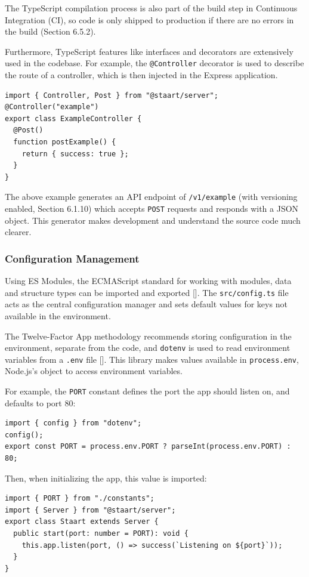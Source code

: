 \documentclass{article}
\begin{document}
The TypeScript compilation process is also part of the build step in Continuous Integration (CI), so code is only shipped to production if there are no errors in the build (Section 6.5.2).

Furthermore, TypeScript features like interfaces and decorators are extensively used in the codebase. For example, the \texttt{@Controller} decorator is used to describe the route of a controller, which is then injected in the Express application.

\begin{verbatim}
import { Controller, Post } from "@staart/server";
@Controller("example")
export class ExampleController {
  @Post()
  function postExample() {
    return { success: true };
  }
}
\end{verbatim}

The above example generates an API endpoint of \texttt{/v1/example} (with versioning enabled, Section 6.1.10) which accepts \texttt{POST} requests and responds with a JSON object. This generator makes development and understand the source code much clearer.

\subsubsection{Configuration Management}

Using ES Modules, the ECMAScript standard for working with modules, data and structure types can be imported and exported []. The \texttt{src/config.ts} file acts as the central configuration manager and sets default values for keys not available in the environment.

The Twelve-Factor App methodology recommends storing configuration in the environment, separate from the code, and \texttt{dotenv} is used to read environment variables from a \texttt{.env} file []. This library makes values available in \texttt{process.env}, Node.js's object to access environment variables.

For example, the \texttt{PORT} constant defines the port the app should listen on, and defaults to port 80:

\begin{verbatim}
import { config } from "dotenv";
config();
export const PORT = process.env.PORT ? parseInt(process.env.PORT) : 80;
\end{verbatim}

Then, when initializing the app, this value is imported:

\begin{verbatim}
import { PORT } from "./constants";
import { Server } from "@staart/server";
export class Staart extends Server {
  public start(port: number = PORT): void {
    this.app.listen(port, () => success(`Listening on ${port}`));
  }
}
\end{verbatim}
\end{document}
